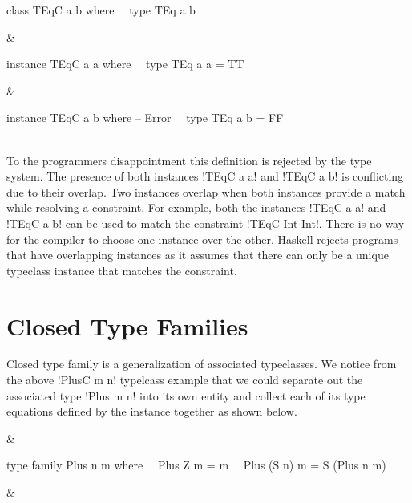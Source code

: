\documentclass[format=acmsmall,manuscript,review,screen,nonacm,margin=1in,11pt]{acmart}
\begin{document}
{\footnotesize\centering
  \begin{tabularx}\textwidth{X X X}
\begin{code}^^J
class TEqC a b where^^J
\ \ type TEq a b^^J
\end{code}&%
\begin{code}^^J
instance TEqC a a where^^J
\ \ type TEq a a = TT^^J
\end{code}&%
\begin{code}^^J
instance TEqC a b where -- Error^^J
\ \ type TEq a b = FF^^J
\end{code}
  \end{tabularx}
}\\
To the programmers disappointment this definition is rejected by the type system.
The presence of both instances !TEqC a a! and !TEqC a b! is conflicting due to their overlap.
Two instances overlap when both instances provide a match while resolving a constraint.
For example, both the instances !TEqC a a! and !TEqC a b! can be used to match the constraint
!TEqC Int Int!. There is no way for the compiler to choose one instance over the other.
Haskell rejects programs that have overlapping instances as it assumes
that there can only be a unique typeclass instance that matches the constraint.

\section{Closed Type Families}\label{sec:tf-closed}
Closed type family is a generalization of associated typeclasses. We notice from
the above !PlusC m n! typelcass example that we could separate out the associated type !Plus m n!
into its own entity and collect each of its type equations defined by the instance together as shown below.
{\footnotesize
\begin{tabularx}\textwidth{X X X}
&\begin{code}^^J
type family Plus n m where^^J
\ \ Plus Z     m = m^^J
\ \ Plus (S n) m = S (Plus n m)^^J
\end{code}&
\end{tabularx}
}
\end{document}
